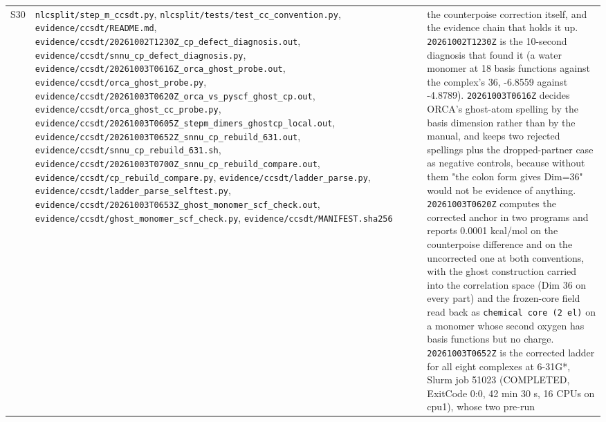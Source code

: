 \documentclass[11pt]{article}
\begin{document}
\begin{longtable}{c>{\raggedright\arraybackslash}p{}>{\raggedright\arraybackslash}p{}}
S30 & \texttt{nlcsplit/step\_m\_ccsdt.py}, \texttt{nlcsplit/\allowbreak{}tests/\allowbreak{}test\_\allowbreak{}cc\_\allowbreak{}convention.py}, \texttt{evidence/ccsdt/README.md}, \texttt{evidence/\allowbreak{}ccsdt/\allowbreak{}20261002T1230Z\_\allowbreak{}cp\_\allowbreak{}defect\_\allowbreak{}diagnosis.out}, \texttt{evidence/\allowbreak{}ccsdt/\allowbreak{}snnu\_\allowbreak{}cp\_\allowbreak{}defect\_\allowbreak{}diagnosis.py}, \texttt{evidence/\allowbreak{}ccsdt/\allowbreak{}20261003T0616Z\_\allowbreak{}orca\_\allowbreak{}ghost\_\allowbreak{}probe.out}, \texttt{evidence/\allowbreak{}ccsdt/\allowbreak{}orca\_\allowbreak{}ghost\_\allowbreak{}probe.py}, \texttt{evidence/\allowbreak{}ccsdt/\allowbreak{}20261003T0620Z\_\allowbreak{}orca\_\allowbreak{}vs\_\allowbreak{}pyscf\_\allowbreak{}ghost\_\allowbreak{}cp.out}, \texttt{evidence/\allowbreak{}ccsdt/\allowbreak{}orca\_\allowbreak{}ghost\_\allowbreak{}cc\_\allowbreak{}probe.py}, \texttt{evidence/\allowbreak{}ccsdt/\allowbreak{}20261003T0605Z\_\allowbreak{}stepm\_\allowbreak{}dimers\_\allowbreak{}ghostcp\_\allowbreak{}local.out}, \texttt{evidence/\allowbreak{}ccsdt/\allowbreak{}20261003T0652Z\_\allowbreak{}snnu\_\allowbreak{}cp\_\allowbreak{}rebuild\_\allowbreak{}631.out}, \texttt{evidence/\allowbreak{}ccsdt/\allowbreak{}snnu\_\allowbreak{}cp\_\allowbreak{}rebuild\_\allowbreak{}631.sh}, \texttt{evidence/\allowbreak{}ccsdt/\allowbreak{}20261003T0700Z\_\allowbreak{}snnu\_\allowbreak{}cp\_\allowbreak{}rebuild\_\allowbreak{}compare.out}, \texttt{evidence/\allowbreak{}ccsdt/\allowbreak{}cp\_\allowbreak{}rebuild\_\allowbreak{}compare.py}, \texttt{evidence/\allowbreak{}ccsdt/\allowbreak{}ladder\_\allowbreak{}parse.py}, \texttt{evidence/\allowbreak{}ccsdt/\allowbreak{}ladder\_\allowbreak{}parse\_\allowbreak{}selftest.py}, \texttt{evidence/\allowbreak{}ccsdt/\allowbreak{}20261003T0653Z\_\allowbreak{}ghost\_\allowbreak{}monomer\_\allowbreak{}scf\_\allowbreak{}check.out}, \texttt{evidence/\allowbreak{}ccsdt/\allowbreak{}ghost\_\allowbreak{}monomer\_\allowbreak{}scf\_\allowbreak{}check.py}, \texttt{evidence/\allowbreak{}ccsdt/\allowbreak{}MANIFEST.sha256} & the counterpoise correction itself, and the evidence chain that holds it up. \texttt{20261002T1230Z} is the 10-second diagnosis that found it (a water monomer at 18 basis functions against the complex's 36, -6.8559 against -4.8789). \texttt{20261003T0616Z} decides ORCA's ghost-atom spelling by the basis dimension rather than by the manual, and keeps two rejected spellings plus the dropped-partner case as negative controls, because without them "the colon form gives Dim=36" would not be evidence of anything. \texttt{20261003T0620Z} computes the corrected anchor in two programs and reports 0.0001 kcal/mol on the counterpoise difference and on the uncorrected one at both conventions, with the ghost construction carried into the correlation space (Dim 36 on every part) and the frozen-core field read back as \texttt{chemical core (2 el)} on a monomer whose second oxygen has basis functions but no charge. \texttt{20261003T0652Z} is the corrected ladder for all eight complexes at 6-31G*, Slurm job 51023 (COMPLETED, ExitCode 0:0, 42 min 30 s, 16 CPUs on cpu1), whose two pre-run 
\end{longtable}
\end{document}
